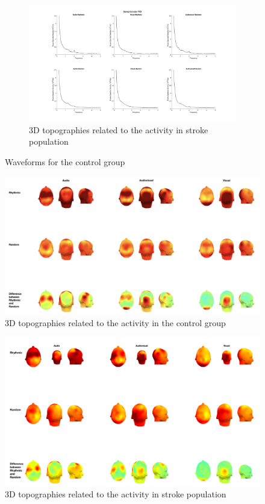 \begin{figure}[htbp]
    \begin{subfigure}[htbp]{0.55\textwidth}
        \includegraphics[width=\textwidth]{stroke_images/sensorimotor_roi.png}
        \caption{3D topographies related to the activity in stroke population}
        \label{fig: Waveforms stroke: sensorimotor}   
    \end{subfigure}
    \caption{Waveforms for the control group}
    \label{fig: Waveforms stroke}
\end{figure} 

\begin{figure}[htbp]
        \includegraphics[width=1\textwidth]{healthy_images/3d_topo.png}
        \caption{3D topographies related to the activity in the control group}
        \label{fig: 3D topographies control group} 
\end{figure}
\begin{figure}
    \includegraphics[width=1\textwidth]{stroke_images/3d_topographies.png}
        \caption{3D topographies related to the activity in stroke population}
        \label{fig: 3D topographies stroke group}   
\end{figure}

